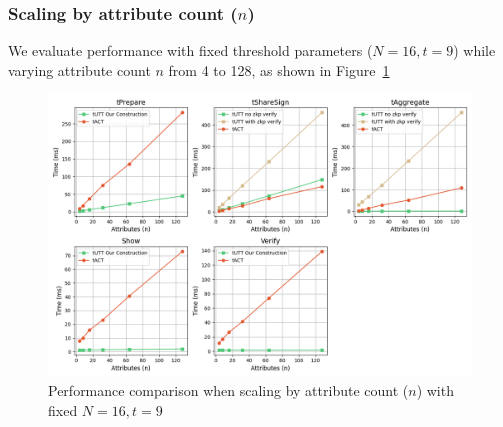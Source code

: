 \subsubsection{Scaling by attribute count ($n$)}
We evaluate performance with fixed threshold parameters ($N=16, t=9$) while varying attribute count $n$ from 4 to 128, as shown in Figure~\ref{fig:chap5_tutt_scale_by_n}

\begin{figure}[!htb]
    \centering
    \vspace{-1em}
    \includegraphics[width=0.9\linewidth]{figures/chap5_tutt_scale_by_n_attributes.png}
    \caption{Performance comparison when scaling by attribute count ($n$) with fixed $N=16, t=9$}
    \label{fig:chap5_tutt_scale_by_n}
    \vspace{-1em}
\end{figure}



